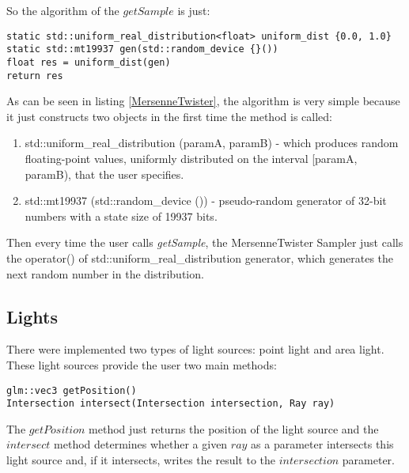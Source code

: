 \par
So the algorithm of the
$getSample$
is just:

\begin{lstlisting}[caption={Algorithm of MersenneTwister Sampler}, captionpos=b, label=MersenneTwister]
static std::uniform_real_distribution<float> uniform_dist {0.0, 1.0}
static std::mt19937 gen(std::random_device {}())
float res = uniform_dist(gen)
return res
\end{lstlisting}

\par
As can be seen in listing \ref{MersenneTwister}, the algorithm is very simple because it just constructs two objects in the first time the method is called:

\begin{enumerate}
	\item std::uniform\_real\_distribution (paramA, paramB) - which produces random floating-point values, uniformly distributed on the interval [paramA, paramB), that the user specifies.
	\item std::mt19937 (std::random\_device {}()) - pseudo-random generator of 32-bit numbers with a state size of 19937 bits.
\end{enumerate}

\par
Then every time the user calls \textit{getSample}, the MersenneTwister Sampler just calls the operator() of std::uniform\_real\_distribution generator, which generates the next random number in the distribution.

\subsection{Lights}

\par
There were implemented two types of light sources: point light and area light.
These light sources provide the user two main methods:

\begin{lstlisting}[caption={Main methods in Light}, captionpos=b, label=Light]
glm::vec3 getPosition()
Intersection intersect(Intersection intersection, Ray ray)
\end{lstlisting}

\par
The
$getPosition$
method just returns the position of the light source and the 
$intersect$
method determines whether a given
$ray$
as a parameter intersects this light source and, if it intersects, writes the result to the
$intersection$
parameter.

